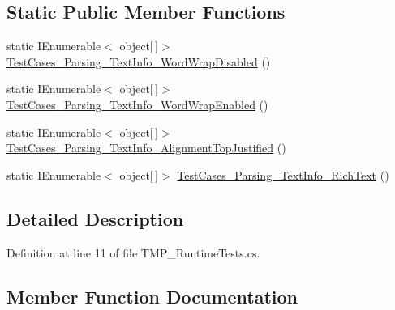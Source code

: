 \subsection*{Static Public Member Functions}
\begin{DoxyCompactItemize}
\item 
static I\+Enumerable$<$ object\mbox{[}$\,$\mbox{]}$>$ \mbox{\hyperlink{class_t_m_pro_1_1_t_m_p___runtime_tests_ad49dfc46be7b4c209e87de8cca277375}{Test\+Cases\+\_\+\+Parsing\+\_\+\+Text\+Info\+\_\+\+Word\+Wrap\+Disabled}} ()
\item 
static I\+Enumerable$<$ object\mbox{[}$\,$\mbox{]}$>$ \mbox{\hyperlink{class_t_m_pro_1_1_t_m_p___runtime_tests_a375c2b367497a32f31a054c55d8bcf0c}{Test\+Cases\+\_\+\+Parsing\+\_\+\+Text\+Info\+\_\+\+Word\+Wrap\+Enabled}} ()
\item 
static I\+Enumerable$<$ object\mbox{[}$\,$\mbox{]}$>$ \mbox{\hyperlink{class_t_m_pro_1_1_t_m_p___runtime_tests_afd5763d35287bd9ab11613a4649d4dab}{Test\+Cases\+\_\+\+Parsing\+\_\+\+Text\+Info\+\_\+\+Alignment\+Top\+Justified}} ()
\item 
static I\+Enumerable$<$ object\mbox{[}$\,$\mbox{]}$>$ \mbox{\hyperlink{class_t_m_pro_1_1_t_m_p___runtime_tests_a807d0252cdcc5e703a924c22747feb38}{Test\+Cases\+\_\+\+Parsing\+\_\+\+Text\+Info\+\_\+\+Rich\+Text}} ()
\end{DoxyCompactItemize}


\subsection{Detailed Description}


Definition at line 11 of file T\+M\+P\+\_\+\+Runtime\+Tests.\+cs.



\subsection{Member Function Documentation}
\mbox{\label{class_t_m_pro_1_1_t_m_p___runtime_tests_a56adfe646fa31d5139bdf0843521badf}} 

